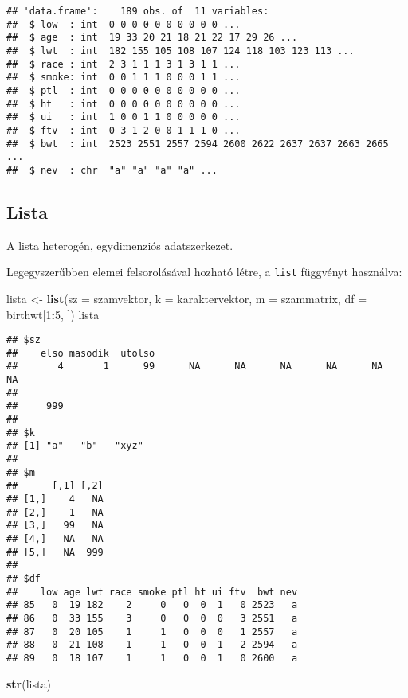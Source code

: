 \documentclass[]{book}
\newenvironment{Shaded}{\begin{snugshade}}{\end{snugshade}}
\newcommand{\KeywordTok}[1]{\textcolor[rgb]{0.13,0.29,0.53}{\textbf{#1}}}
\newcommand{\DataTypeTok}[1]{\textcolor[rgb]{0.13,0.29,0.53}{#1}}
\newcommand{\DecValTok}[1]{\textcolor[rgb]{0.00,0.00,0.81}{#1}}
\newcommand{\StringTok}[1]{\textcolor[rgb]{0.31,0.60,0.02}{#1}}
\newcommand{\OperatorTok}[1]{\textcolor[rgb]{0.81,0.36,0.00}{\textbf{#1}}}
\newcommand{\NormalTok}[1]{#1}
\begin{document}
\begin{verbatim}
## 'data.frame':    189 obs. of  11 variables:
##  $ low  : int  0 0 0 0 0 0 0 0 0 0 ...
##  $ age  : int  19 33 20 21 18 21 22 17 29 26 ...
##  $ lwt  : int  182 155 105 108 107 124 118 103 123 113 ...
##  $ race : int  2 3 1 1 1 3 1 3 1 1 ...
##  $ smoke: int  0 0 1 1 1 0 0 0 1 1 ...
##  $ ptl  : int  0 0 0 0 0 0 0 0 0 0 ...
##  $ ht   : int  0 0 0 0 0 0 0 0 0 0 ...
##  $ ui   : int  1 0 0 1 1 0 0 0 0 0 ...
##  $ ftv  : int  0 3 1 2 0 0 1 1 1 0 ...
##  $ bwt  : int  2523 2551 2557 2594 2600 2622 2637 2637 2663 2665 ...
##  $ nev  : chr  "a" "a" "a" "a" ...
\end{verbatim}

\subsection{Lista}\label{lista}

A lista heterogén, egydimenziós adatszerkezet.

Legegyszerűbben elemei felsorolásával hozható létre, a \texttt{list}
függvényt használva:

\begin{Shaded}
\begin{Highlighting}[]
\NormalTok{lista <-}\StringTok{ }\KeywordTok{list}\NormalTok{(}\DataTypeTok{sz =}\NormalTok{ szamvektor, }\DataTypeTok{k =}\NormalTok{ karaktervektor, }\DataTypeTok{m =}\NormalTok{ szammatrix, }\DataTypeTok{df =}\NormalTok{ birthwt[}\DecValTok{1}\OperatorTok{:}\DecValTok{5}\NormalTok{, }
\NormalTok{    ])}
\NormalTok{lista}
\end{Highlighting}
\end{Shaded}

\begin{verbatim}
## $sz
##    elso masodik  utolso                                                 
##       4       1      99      NA      NA      NA      NA      NA      NA 
##         
##     999 
## 
## $k
## [1] "a"   "b"   "xyz"
## 
## $m
##      [,1] [,2]
## [1,]    4   NA
## [2,]    1   NA
## [3,]   99   NA
## [4,]   NA   NA
## [5,]   NA  999
## 
## $df
##    low age lwt race smoke ptl ht ui ftv  bwt nev
## 85   0  19 182    2     0   0  0  1   0 2523   a
## 86   0  33 155    3     0   0  0  0   3 2551   a
## 87   0  20 105    1     1   0  0  0   1 2557   a
## 88   0  21 108    1     1   0  0  1   2 2594   a
## 89   0  18 107    1     1   0  0  1   0 2600   a
\end{verbatim}

\begin{Shaded}
\begin{Highlighting}[]
\KeywordTok{str}\NormalTok{(lista)}
\end{Highlighting}
\end{Shaded}
\end{document}
